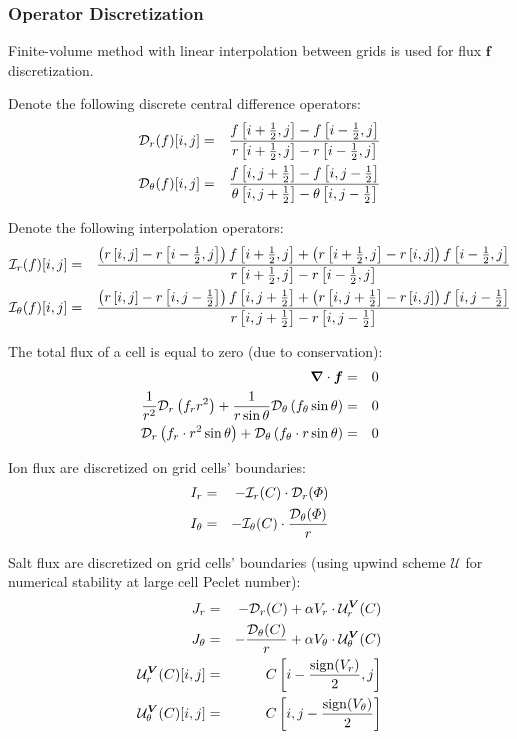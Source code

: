 \subsubsection{Operator Discretization}
Finite-volume method with linear interpolation between grids is used for flux 
$\boldsymbol{f}$ discretization. 

Denote the following discrete central difference operators:
\begin{eqnarray}
\mathcal{D}_r(f)[i,j] &=& \frac{f\left[i+\frac{1}{2},j\right] - f\left[i-\frac{1}{2},j\right]}
                       {r\left[i+\frac{1}{2},j\right] - r\left[i-\frac{1}{2},j\right]} \\
\mathcal{D}_\theta(f)[i,j] &=& \frac{f\left[i,j+\frac{1}{2}\right] - f\left[i,j-\frac{1}{2}\right]}
					   {\theta\left[i,j+\frac{1}{2}\right] - \theta\left[i,j-\frac{1}{2}\right]}
\end{eqnarray}

Denote the following interpolation operators:
\begin{eqnarray}
\mathcal{I}_r(f)[i,j] &=& \frac{
\left(r\left[i,j\right] - r\left[i-\frac{1}{2},j\right]\right) 
  f\left[i+\frac{1}{2},j\right] + 
\left(r\left[i+\frac{1}{2},j\right] - r\left[i,j\right]\right) 
  f\left[i-\frac{1}{2},j\right] 
}{r\left[i+\frac{1}{2},j\right] - r\left[i-\frac{1}{2},j\right]}
\\
\mathcal{I}_\theta(f)[i,j] &=& 
\frac{
\left(r\left[i,j\right] - r\left[i,j-\frac{1}{2}\right]\right) 
  f\left[i,j+\frac{1}{2}\right] + 
\left(r\left[i,j+\frac{1}{2}\right] - r\left[i,j\right]\right) 
  f\left[i,j-\frac{1}{2}\right] 
}{r\left[i,j+\frac{1}{2}\right] - r\left[i,j-\frac{1}{2}\right]}
\end{eqnarray}

The total flux of a cell is equal to zero (due to conservation):
\begin{eqnarray}
\boldsymbol{\nabla} \cdot \boldsymbol{f} &=& 0 
\\
\frac{1}{r^2} \mathcal{D}_r\left(f_r r^2\right) + 
\frac{1}{r \sin\theta} \mathcal{D}_\theta\left(f_\theta \sin\theta\right) &=& 0 
\\
\mathcal{D}_r\left(f_r \cdot r^2 \sin\theta\right) + \mathcal{D}_\theta\left(f_\theta \cdot r \sin\theta\right) &=& 0 
\end{eqnarray}

Ion flux are discretized on grid cells' boundaries:
\begin{eqnarray}
I_r &=& -\mathcal{I}_r(C) \cdot \mathcal{D}_r(\varPhi) \\
I_\theta &=& -\mathcal{I}_\theta(C) \cdot \frac{\mathcal{D}_\theta(\varPhi)}{r} 
\end{eqnarray}

Salt flux are discretized on grid cells' boundaries 
(using upwind scheme $\mathcal{U}$ for numerical stability at large cell Peclet number):
\begin{eqnarray}
J_r &=& -\mathcal{D}_r(C) + \alpha V_r \cdot \mathcal{U}^{\boldsymbol{V}}_r (C) \\
J_\theta &=& -\frac{\mathcal{D}_\theta(C)}{r} + \alpha V_\theta \cdot \mathcal{U}^{\boldsymbol{V}}_\theta (C) \\
 \mathcal{U}^{\boldsymbol{V}}_r(C)[i,j] &=& C\left[i-\frac{\mathrm{sign}(V_r)}{2}, j\right] \\
 \mathcal{U}^{\boldsymbol{V}}_\theta(C)[i,j] &=& C\left[i, j-\frac{\mathrm{sign}(V_\theta)}{2}\right] 
\end{eqnarray}

